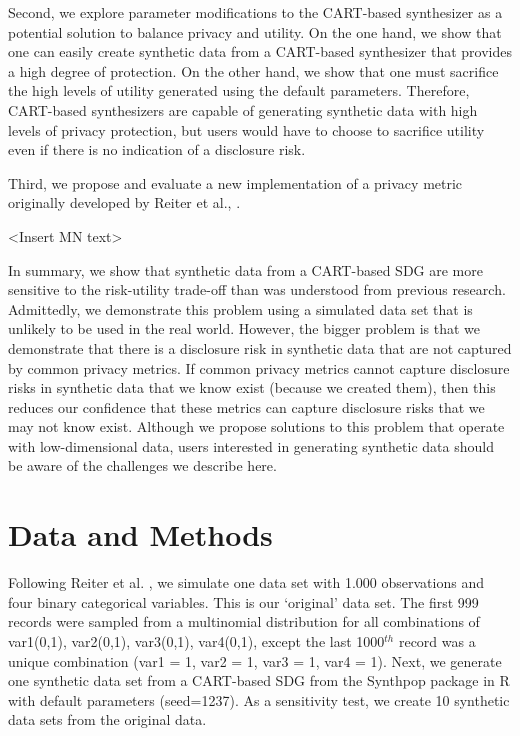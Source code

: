 \documentclass[runningheads]{llncs}
\begin{document}
Second, we explore parameter modifications to the CART-based synthesizer as a potential solution to balance privacy and utility.  On the one hand, we show that one can easily create synthetic data from a CART-based synthesizer that provides a high degree of protection.  On the other hand, we show that one must sacrifice the high levels of utility generated using the default parameters.  Therefore, CART-based synthesizers are capable of generating synthetic data with high levels of privacy protection, but users would have to choose to sacrifice utility even if there is no indication of a disclosure risk.

Third, we propose and evaluate a new implementation of a privacy metric originally developed by Reiter et al., \cite{reiter2014bayesian}. 

<Insert MN text>

In summary, we show that synthetic data from a CART-based SDG are more sensitive to the risk-utility trade-off than was understood from previous research.  Admittedly, we demonstrate this problem using a simulated data set that is unlikely to be used in the real world.  However, the bigger problem is that we demonstrate that there is a disclosure risk in synthetic data that are not captured by common privacy metrics.  If common privacy metrics cannot capture disclosure risks in synthetic data that we know exist (because we created them), then this reduces our confidence that these metrics can capture disclosure risks that we may not know exist.  Although we propose solutions to this problem that operate with low-dimensional data, users interested in generating synthetic data should be aware of the challenges we describe here.

\section{Data and Methods}

Following Reiter et al. \cite{reiter2014bayesian}, we simulate one data set with 1.000 observations and four binary categorical variables.  This is our `original' data set.  The first 999 records were sampled from a multinomial distribution for all combinations of var1(0,1), var2(0,1), var3(0,1), var4(0,1), except the last 1000$^{th}$ record was a unique combination (var1 = 1, var2 = 1, var3 = 1, var4 = 1).  Next, we generate one synthetic data set from a CART-based SDG from the Synthpop package in R with default parameters (seed=1237).  As a sensitivity test, we create 10 synthetic data sets from the original data.
\end{document}
